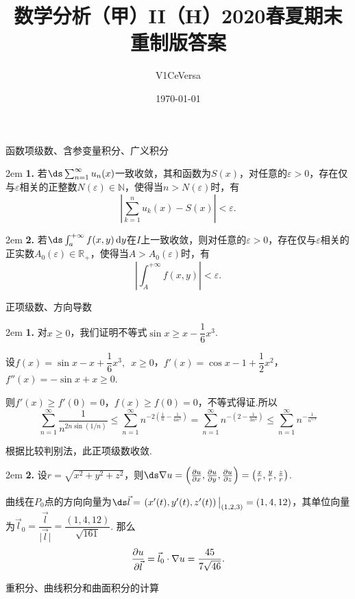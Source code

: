 \documentclass[UTF8,14pt,normal]{ctexart}
\title{数学分析（甲）II（H）2020春夏期末\quad 重制版答案}
\author{V1CeVersa}
\date{\today}
\begin{document}
\maketitle

 函数项级数、含参变量积分、广义积分

    \hangindent 2em
    \noindent
    \textbf{1.}
    若\(\ds \sum_{n=1}^{\infty}u_n(x)\)一致收敛，其和函数为\(S(x)\)，对任意的\(\varepsilon>0\)，存在仅与\(\varepsilon\)相关的正整数\(N(\varepsilon)\in\mathbb{N}\)，使得当\(n>N(\varepsilon)\)时，有\[\left|\sum_{k=1}^{n}u_k(x)-S(x)\right|<\varepsilon.\]

    \hangindent 2em
    \noindent
    \textbf{2.}
    若\(\ds\int_{a}^{+\infty}f(x,y)\dd{y}\)在\(I\)上一致收敛，则对任意的\(\varepsilon>0\)，存在仅与\(\varepsilon\)相关的正实数\(A_0(\varepsilon)\in\mathbb{R}_{+}\)，使得当\(A>A_0(\varepsilon)\)时，有\[\left|\int_{A}^{+\infty}f(x,y)\right|<\varepsilon.\]

 正项级数、方向导数

    \hangindent 2em
    \noindent
    \textbf{1.}
    对\(x\geqslant0\)，我们证明不等式\(\sin x\geqslant x-\dfrac{1}{6}x^3\).

    设\(f(x)=\sin x-x +\dfrac{1}{6}x^3,\enspace x\geqslant0\)，\(f'(x) = \cos x -1 +\dfrac{1}{2}x^2\)，\(f''(x) = -\sin x+x\geqslant0\).

    则\(f'(x)\geqslant f'(0) = 0\)，\(f(x)\geqslant f(0)= 0\)，不等式得证.所以
    \[\sum_{n=1}^{\infty}\frac{1}{n^{2n\sin(1/n)}}\leqslant\sum_{n=1}^{\infty}n^{-2(\frac{1}{n}-\frac{1}{6n^3})} = \sum_{n=1}^{\infty}n^{-(2-\frac{1}{3n^2})}\leqslant\sum_{n=1}^{\infty}n^{-\frac{1}{n^{5/3}}}\]

    根据比较判别法，此正项级数收敛.

    \hangindent 2em
    \noindent
    \textbf{2.}
    设\(r=\sqrt{x^2+y^2+z^2}\)，则\(\ds \nabla u = \left(\pdv{u}{x},\pdv{u}{y},\pdv{u}{z}\right) = \left(\frac{x}{r},\frac{y}{r},\frac{z}{r}\right)\).

    曲线在\(P_0\)点的方向向量为\(\ds \vec{l} = \eval{\left(x'(t),y'(t),z'(t)\right)}_{(1,2,3)} = (1,4,12)\)，其单位向量为\(\vec{l}_0 = \dfrac{\vec{l}}{\lvert\vec{l}\rvert} = \dfrac{(1,4,12)}{\sqrt{161}}\).
    那么\[\pdv{u}{\vec{l}} = \vec{l}_0\cdot\nabla u = \frac{45}{7\sqrt{46}}.\]

\clearpage
{} 重积分、曲线积分和曲面积分的计算
\end{document}

